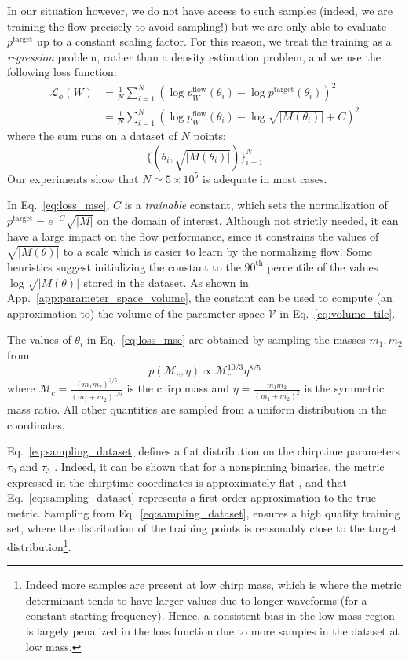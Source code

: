 \documentclass[twocolumn,showpacs,preprintnumbers,nofootinbib,prd,
superscriptaddress,10pt]{revtex4-2}
\begin{document}
In our situation however, we do not have access to such samples (indeed, we are training the flow precisely to avoid sampling!) but we are only able to evaluate $p^\text{target}$ up to a constant scaling factor.
For this reason, we treat the training as a {\it regression} problem, rather than a density estimation problem, and we use the following loss function:
%
\begin{align}\label{eq:loss_mse}
	\mathcal{L}_\phi(W) &= \frac{1}{N} \sum_{i=1}^N \left(\log p^\text{flow}_W(\theta_i) - \log p^\text{target}(\theta_i) \right)^2 \nonumber\\
						&= \frac{1}{N} \sum_{i=1}^N \left(\log p^\text{flow}_W(\theta_i) - \log\sqrt{|M(\theta_i)|} + C \right)^2
\end{align}
%
where the sum runs on a dataset of $N$ points:
\begin{equation}
	\{(\theta_i, \sqrt{|M(\theta_i)|})\}_{i=1}^N
\end{equation}
Our experiments show that ${N \simeq 5 \times 10^5}$ is adequate in most cases.

In Eq.~\eqref{eq:loss_mse}, $C$ is a {\it trainable} constant, which sets the normalization of $p^\text{target} = e^{-C} \sqrt{|M|}$ on the domain of interest.
Although not strictly needed, it can have a large impact on the flow performance, since it constrains the values of $\sqrt{|M(\theta)|}$ to a scale which is easier to learn by the normalizing flow.
Some heuristics suggest initializing the constant to the $90^\text{th}$ percentile of the values $\log \sqrt{|M(\theta)|}$ stored in the dataset.
As shown in App.~\ref{app:parameter_space_volume}, the constant can be used to compute (an approximation to) the volume of the parameter space $\mathcal{V}$ in Eq.~\eqref{eq:volume_tile}.

The values of $\theta_i$ in Eq.~\eqref{eq:loss_mse} are obtained by sampling the masses $m_1, m_2$ from
\begin{equation}\label{eq:sampling_dataset}
	p(\mathcal{M}_c, \eta) \propto \mathcal{M}_c^{10/3} \eta^{8/5}
\end{equation}
where $\mathcal{M}_c = \frac{(m_1m_2)^{3/5}}{(m_1+m_2)^{1/5}}$ is the chirp mass and $\eta = \frac{m_1m_2}{(m_1+m_2)^2}$ is the symmetric mass ratio.
All other quantities are sampled from a uniform distribution in the coordinates.

Eq.~\eqref{eq:sampling_dataset} defines a flat distribution on the chirptime parameters $\tau_0$ and $\tau_3$ \cite{Cokelaer:2007kx}. Indeed, it can be shown that for a nonspinning binaries, the metric expressed in the chirptime coordinates is approximately flat \cite{Sathyaprakash:1991mt, Dhurandhar:1992mw}, and that Eq.~\eqref{eq:sampling_dataset} represents a first order approximation to the true metric.
Sampling from Eq.~\eqref{eq:sampling_dataset}, ensures a high quality training set, where the distribution of the training points is reasonably close to the target distribution\footnote{Indeed more samples are present at low chirp mass, which is where the metric determinant tends to have larger values due to longer waveforms (for a constant starting frequency). Hence, a consistent bias in the low mass region is largely penalized in the loss function due to more samples in the dataset at low mass.}.
\end{document}
